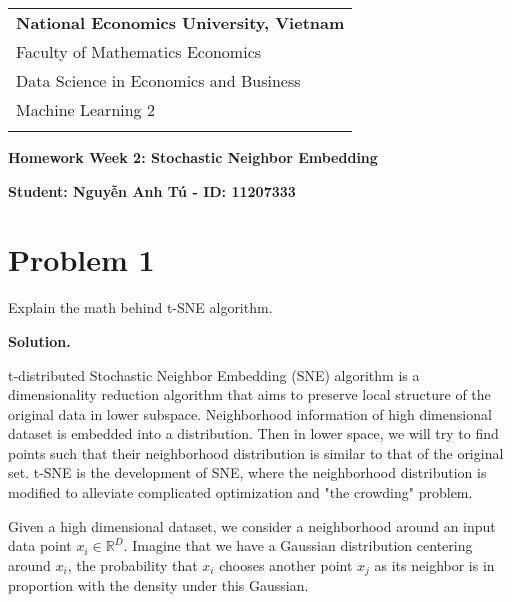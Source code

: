 \documentclass[a4paper, 12pt]{article}  %
\begin{document}
\thispagestyle{empty} %

\begin{tabular}{p{12.5cm}} %
{\large \bf National Economics University, Vietnam} \\
Faculty of Mathematics Economics \\ Data Science in Economics and Business  \\ Machine Learning 2\\
\hline %
\\
\end{tabular} %

\vspace*{0.3cm} %

\begin{center} %
	{\Large \bf Homework Week 2: Stochastic Neighbor Embedding}
	\vspace{2mm}
	
	{\bf Student: Nguyễn Anh Tú - ID: 11207333} %
\end{center}  

\section*{Problem 1}

Explain the math behind t-SNE algorithm.

\textbf{Solution.}

t-distributed Stochastic Neighbor Embedding (SNE) algorithm is a dimensionality reduction algorithm that aims to preserve local structure of the original data in lower subspace. Neighborhood information of high dimensional dataset is embedded into a distribution. Then in lower space, we will try to find points such that their neighborhood distribution is similar to that of the original set. t-SNE is the development of SNE, where the neighborhood distribution is modified to alleviate complicated optimization and "the crowding" problem.

Given a high dimensional dataset, we consider a neighborhood around an input data point $x_i \in \mathbb{R}^D$. Imagine that we have a Gaussian distribution centering around $x_i$, the probability that $x_i$ chooses another point $x_j$ as its neighbor is in proportion with the density under this Gaussian. 
\end{document}
